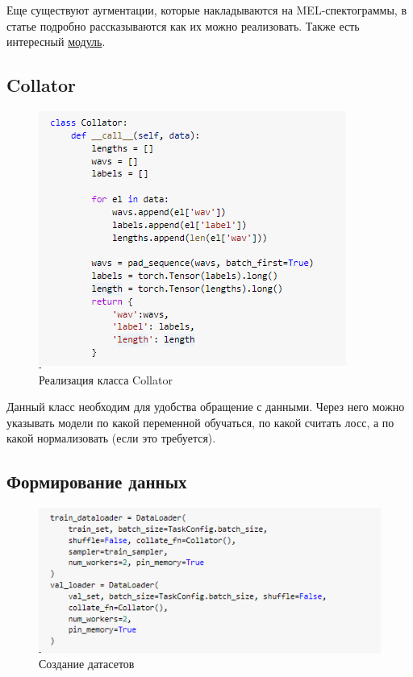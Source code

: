 \documentclass[a4paper,12pt]{article}
\begin{document}
  	Еще существуют аугментации, которые накладываются на MEL-спектограммы, в статье \cite{1} подробно рассказываются как их можно реализовать. Также есть интересный \href{https://speechbrain.readthedocs.io/en/latest/API/speechbrain.processing.speech_augmentation.html#speechbrain.processing.speech_augmentation.AddBabble}{модуль}. 
 	 
 	\subsection{Collator}
 	
 	\begin{figure}[H]
 		\centering
 		\includegraphics[width=0.7\linewidth]{Image/Collator}
 		\caption{Реализация класса Collator}
 		\label{fig:collator}
 	\end{figure}
 	Данный класс необходим для удобства обращение с данными. Через него можно указывать модели по какой переменной обучаться, по какой считать лосс, а по какой нормализовать (если это требуется).
 	
 	
 	\subsection{Формирование данных}
 	\begin{figure}[H]
 		\centering
 		\includegraphics[width=0.7\linewidth]{Image/Dataloader}
 		\caption{Создание датасетов}
 		\label{fig:dataloader}
 	\end{figure}
 
\end{document}

